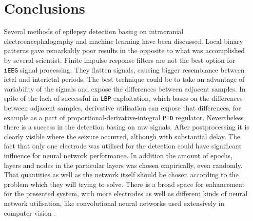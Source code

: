 \chapter{Conclusions}
\endgroup
Several methods of epilepsy detection basing on intracranial electroencephalography and machine learning have been discussed. Local binary patterns gave remarkably poor results in the opposite to what was accomplished by several scientist. Finite impulse response filters are not the best option for \verb|iEEG| signal processing. They flatten signals, causing bigger resemblance between ictal and interictal periods. The best technique could be to take an advantage of variability of the signals and expose the differences between adjacent samples. In spite of the lack of successful in \verb|LBP| exploitation, which bases on the differences between adjacent samples, derivative utilisation can expose that differences, for example as a part of proportional-derivative-integral \verb|PID| regulator. Nevertheless there is a success in the detection basing on raw signals. After postprocessing it is clearly visible where the seizure occurred, although with substantial delay.
The fact that only one electrode was utilised for the detection could have significant influence for neural network performance. In addition the amount of epochs, layers and nodes in the particular layers was chosen empirically, even randomly. That quantities as well as the network itself should be chosen according to the problem which they will trying to solve. There is a broad space for enhancement for the presented system, with more electrodes as well as different kinds of neural network utilisation, like convolutional neural networks used extensively in computer vision \cite{convolutional}. 
